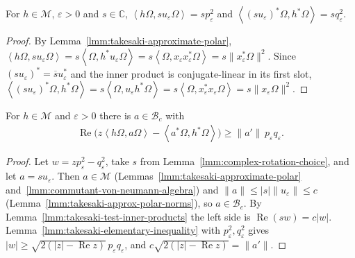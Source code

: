 \begin{lemma}
    \label{lmm:takesaki-test-inner-products}
    \leanok
    For $h \in \mathcal{M}$, $\varepsilon > 0$ and $s \in \mathbb{C}$, $\left< h\Omega, s u_\varepsilon\Omega \right> = sp_\varepsilon^2$ and $\left< (s u_\varepsilon)^*\Omega, h^*\Omega \right> = sq_\varepsilon^2$.
\end{lemma}
\begin{proof}
    \leanok
    By Lemma~\ref{lmm:takesaki-approximate-polar}, $\left< h\Omega, su_\varepsilon\Omega \right> = s\left< \Omega, h^*u_\varepsilon\Omega \right> = s\left< \Omega, x_\varepsilon x_\varepsilon^*\Omega \right> = s\|x_\varepsilon^*\Omega\|^2$. Since $(su_\varepsilon)^* = \overline{s}u_\varepsilon^*$ and the inner product is conjugate-linear in its first slot, $\left< (su_\varepsilon)^*\Omega, h^*\Omega \right> = s\left< \Omega, u_\varepsilon h^*\Omega \right> = s\left< \Omega, x_\varepsilon^*x_\varepsilon\Omega \right> = s\|x_\varepsilon\Omega\|^2$.
\end{proof}

\begin{lemma}
    \label{lmm:takesaki-test-element}
    \leanok
    For $h \in \mathcal{M}$ and $\varepsilon > 0$ there is $a \in \mathcal{B}_c$ with
    \begin{align}
        \operatorname{Re}\big( z\left< h\Omega, a\Omega \right> - \left< a^*\Omega, h^*\Omega \right> \big) \ge \|a'\|\,p_\varepsilon q_\varepsilon.
    \end{align}
\end{lemma}
\begin{proof}
    \leanok
    Let $w = zp_\varepsilon^2 - q_\varepsilon^2$, take $s$ from Lemma~\ref{lmm:complex-rotation-choice}, and let $a = su_\varepsilon$. Then $a \in \mathcal{M}$ (Lemmas~\ref{lmm:takesaki-approximate-polar} and~\ref{lmm:commutant-von-neumann-algebra}) and $\|a\| \le |s|\|u_\varepsilon\| \le c$ (Lemma~\ref{lmm:takesaki-approx-polar-norms}), so $a \in \mathcal{B}_c$. By Lemma~\ref{lmm:takesaki-test-inner-products} the left side is $\operatorname{Re}(sw) = c|w|$. Lemma~\ref{lmm:takesaki-elementary-inequality} with $p_\varepsilon^2, q_\varepsilon^2$ gives $|w| \ge \sqrt{2(|z| - \operatorname{Re} z)}\,p_\varepsilon q_\varepsilon$, and $c\sqrt{2(|z| - \operatorname{Re} z)} = \|a'\|$.
\end{proof}

